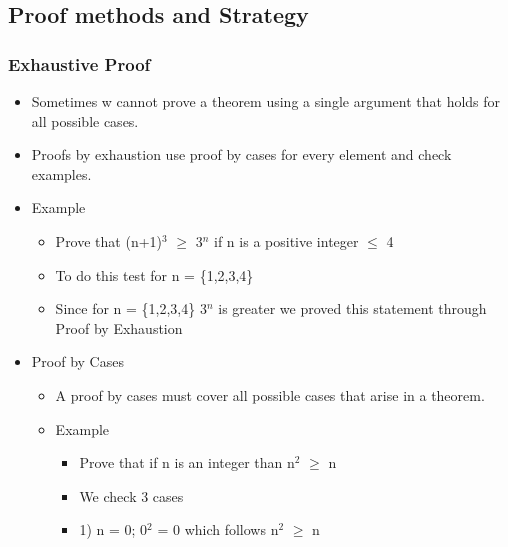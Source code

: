 \documentclass[11pt]{article}
\begin{document}
\subsection{Proof methods and Strategy}
\label{sec-1-8}
\subsubsection{Exhaustive Proof}
\label{sec-1-8-1}
\begin{itemize}

\item Sometimes w cannot prove a theorem using a single argument that holds for all possible cases.
\label{sec-1-8-1-1}%

\item Proofs by exhaustion use proof by cases for every element and check examples.
\label{sec-1-8-1-2}%

\item Example
\label{sec-1-8-1-3}%
\begin{itemize}

\item Prove that (n+1)$^3$ $\ge$ 3$^n$ if n is a positive integer $\le$ 4
\label{sec-1-8-1-3-1}%

\item To do this test for n = \{1,2,3,4\}
\label{sec-1-8-1-3-2}%

\item Since for n = \{1,2,3,4\} 3$^n$ is greater we proved this statement through Proof by Exhaustion
\label{sec-1-8-1-3-3}%
\end{itemize} %

\item Proof by Cases
\label{sec-1-8-1-4}%
\begin{itemize}

\item A proof by cases must cover all possible cases that arise in a theorem.
\label{sec-1-8-1-4-1}%

\item Example
\label{sec-1-8-1-4-2}%
\begin{itemize}

\item Prove that if n is an integer than n$^2$ $\ge$ n
\label{sec-1-8-1-4-2-1}%

\item We check 3 cases
\label{sec-1-8-1-4-2-2}%

\item 1) n = 0; 0$^2$ = 0 which follows n$^2$ $\ge$ n
\label{sec-1-8-1-4-2-3}%


\end{itemize}
\end{itemize}
\end{itemize}
\end{document}
